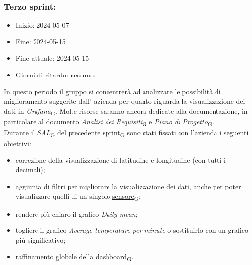 \newpage
\subsubsection{Terzo sprint:}
\begin{itemize}
	\item Inizio: 2024-05-07
	\item Fine: 2024-05-15
	\item Fine attuale: 2024-05-15
	\item Giorni di ritardo: nessuno.
\end{itemize}

In questo periodo il gruppo si concentrerà ad analizzare le possibilità di miglioramento suggerite dall' azienda per quanto riguarda la visualizzazione dei dati in \href{https://7last.github.io/docs/rtb/documentazione-interna/glossario\#grafana}{\textit{Grafana}\textsubscript{G}}. Molte risorse saranno ancora dedicate alla documentazione, in particolare al documento \href{https://7last.github.io/docs/rtb/documentazione-interna/glossario\#analisi-dei-requisiti}{\textit{Analisi dei Requisiti}\textsubscript{G}} e \href{https://7last.github.io/docs/rtb/documentazione-interna/glossario\#piano-di-progetto}{\textit{Piano di Progetto}\textsubscript{G}}. \\
Durante il \href{https://7last.github.io/docs/rtb/documentazione-interna/glossario\#stato-avanzamento-lavori}{\textit{SAL}\textsubscript{G}} del precedente \href{https://7last.github.io/docs/rtb/documentazione-interna/glossario\#sprint}{sprint\textsubscript{G}} sono stati fissati con l'azienda i seguenti obiettivi:
\begin{itemize}
	\item correzione della visualizzazione di latitudine e longitudine (con tutti i decimali);
	\item aggiunta di filtri per migliorare la visualizzazione dei dati, anche per poter visualizzare quelli di un singolo \href{https://7last.github.io/docs/rtb/documentazione-interna/glossario\#sensore}{sensore\textsubscript{G}};
	\item rendere più chiaro il grafico \textit{Daily mean};
	\item togliere il grafico \textit{Average temperature per minute} o sostituirlo con un grafico più significativo;
	\item raffinamento globale della \href{https://7last.github.io/docs/rtb/documentazione-interna/glossario\#dashboard}{dashboard\textsubscript{G}}.
\end{itemize}


